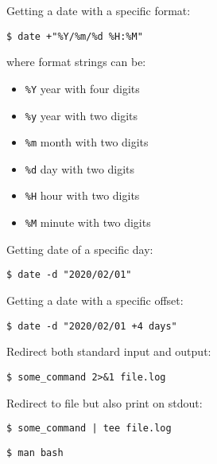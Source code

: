 \documentclass[twocolumn,8pt]{article}
\begin{document}

\begin{mdframed}[frametitle=Dates]
Getting a date with a specific format:
\begin{lstlisting}
$ date +"%Y/%m/%d %H:%M"
\end{lstlisting}

where format strings can be:
\begin{itemize}\itemsep0pt
    \item \texttt{\%Y} year with four digits
    \item \texttt{\%y} year with two digits
    \item \texttt{\%m} month with two digits
    \item \texttt{\%d} day with two digits
    \item \texttt{\%H} hour with two digits
    \item \texttt{\%M} minute with two digits
\end{itemize}
\vspace{10pt}

Getting date of a specific day:
\begin{lstlisting}
$ date -d "2020/02/01"
\end{lstlisting}

Getting a date with a specific offset:

\begin{lstlisting}
$ date -d "2020/02/01 +4 days"
\end{lstlisting}

\end{mdframed}



\begin{mdframed}[frametitle=Redirection]
Redirect both standard input and output:
\begin{lstlisting}
$ some_command 2>&1 file.log
\end{lstlisting}

Redirect to file but also print on stdout:
\begin{lstlisting}
$ some_command | tee file.log
\end{lstlisting}

\end{mdframed}    



\begin{mdframed}[frametitle=Resources]
\begin{lstlisting}
$ man bash
\end{lstlisting}
\end{mdframed}    
\end{document}

